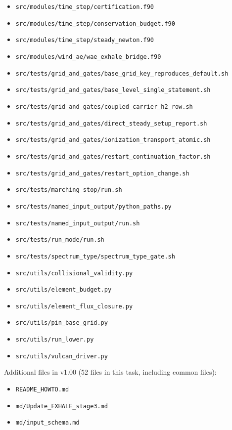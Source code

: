 \documentclass[english,a4paper]{my_memo}
\providecommand{\tightlist}{\setlength{\itemsep}{0pt}\setlength{\parskip}{0pt}}
\begin{document}
\begin{itemize}
  \texttt{src/modules/states/boundary\_state\_trace.f90}
\item
  \texttt{src/modules/time\_step/certification.f90}
\item
  \texttt{src/modules/time\_step/conservation\_budget.f90}
\item
  \texttt{src/modules/time\_step/steady\_newton.f90}
\item
  \texttt{src/modules/wind\_ae/wae\_exhale\_bridge.f90}
\item
  \texttt{src/tests/grid\_and\_gates/base\_grid\_key\_reproduces\_default.sh}
\item
  \texttt{src/tests/grid\_and\_gates/base\_level\_single\_statement.sh}
\item
  \texttt{src/tests/grid\_and\_gates/coupled\_carrier\_h2\_row.sh}
\item
  \texttt{src/tests/grid\_and\_gates/direct\_steady\_setup\_report.sh}
\item
  \texttt{src/tests/grid\_and\_gates/ionization\_transport\_atomic.sh}
\item
  \texttt{src/tests/grid\_and\_gates/restart\_continuation\_factor.sh}
\item
  \texttt{src/tests/grid\_and\_gates/restart\_option\_change.sh}
\item
  \texttt{src/tests/marching\_stop/run.sh}
\item
  \texttt{src/tests/named\_input\_output/python\_paths.py}
\item
  \texttt{src/tests/named\_input\_output/run.sh}
\item
  \texttt{src/tests/run\_mode/run.sh}
\item
  \texttt{src/tests/spectrum\_type/spectrum\_type\_gate.sh}
\item
  \texttt{src/utils/collisional\_validity.py}
\item
  \texttt{src/utils/element\_budget.py}
\item
  \texttt{src/utils/element\_flux\_closure.py}
\item
  \texttt{src/utils/pin\_base\_grid.py}
\item
  \texttt{src/utils/run\_lower.py}
\item
  \texttt{src/utils/vulcan\_driver.py}
\end{itemize}

Additional files in v1.00 (52 files in this task, including common files):

\begin{itemize}
\tightlist
\item
  \texttt{README\_HOWTO.md}
\item
  \texttt{md/Update\_EXHALE\_stage3.md}
\item
  \texttt{md/input\_schema.md}
\end{itemize}
\end{document}
